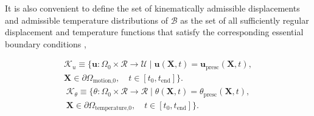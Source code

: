 It is also convenient to define the set of kinematically admissible displacements and admissible temperature distributions of $\mathscr{B}$ as the set of all sufficiently regular displacement and temperature functions that satisfy the corresponding essential boundary conditions \citep{de_souza_neto_computational_2008},
\begin{highlight}[innertopmargin=-5pt]
    \begin{multline}
        \mathscr{K}_u\equiv \{\bm u:\Omega_0\times \mathscr{R}\to \mathscr{U}\;|\;\bm u(\bm X,t) = \bm u_\text{presc} (\bm X,t),\\ \bm X\in\partial \Omega_\text{motion,0},\quad t\in [t_0,t_\text{end}]\}.\quad
    \end{multline}
    \begin{multline}
        \mathscr{K}_\theta\equiv \{\theta:\Omega_0\times \mathscr{R}\to \mathscr{R}\;|\;\theta(\bm X,t) = \theta_\text{presc} (\bm X,t),\\ \bm X\in\partial \Omega_\text{temperature,0},\quad t\in [t_0,t_\text{end}]\}.\quad
    \end{multline}
\end{highlight}


